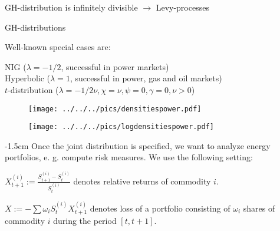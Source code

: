 	GH-distribution is infinitely
divisible $\rightarrow$ Levy-processes






{GH-distributions}

Well-known special cases are:






	NIG ($\lambda=-1/2$, successful in power markets)\\[-1.5cm]

	Hyperbolic ($\lambda=1$, successful in power, gas and oil markets)\\[-1.5cm]

	$t$-distribution ($\lambda=-1/2\nu, \chi=\nu, \psi=0,
\gamma=0, \nu>0$)






{} %
\begin{center}
\begin{figure}
\texttt{[image: ../../../pics/densitiespower.pdf]}
\end{figure}
\end{center}

{} %
\begin{center}
\begin{figure}
\texttt{[image: ../../../pics/logdensitiespower.pdf]}
\end{figure}
\end{center}

{-1.5cm}
Once the joint distribution is specified, we want to analyze
energy portfolios, e. g. compute risk measures. We use the
following setting:






	$X_{t+1}^{(i)}:=\frac{S_{t+1}^{(i)}-S_t^{(i)}}{S_t^{(i)}}$
denotes relative returns of commodity $i$.

	$X:=-\sum\omega_iS_t^{(i)}X_{t+1}^{(i)}$ denotes loss of a
portfolio consisting of $\omega_i$ shares of commodity $i$ during
the period $[t,t+1]$.



